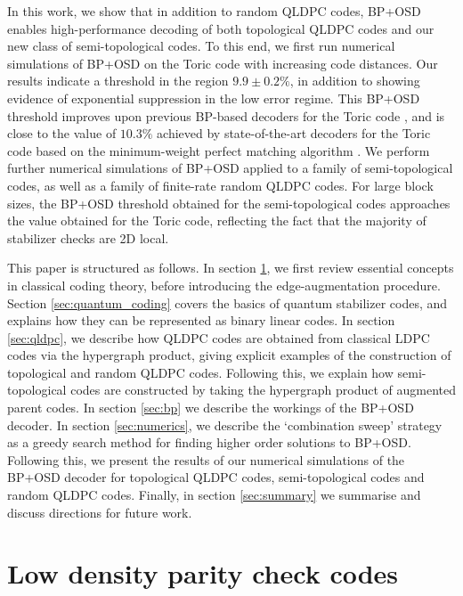 \documentclass[%
 reprint,
superscriptaddress,
nofootinbib,
 amsmath,amssymb,
secnumarabic
]{revtex4-1}
\begin{document}
In this work, we show that in addition to random QLDPC codes, BP+OSD enables high-performance decoding of both topological QLDPC codes and our new class of semi-topological codes. To this end, we first run numerical simulations of BP+OSD on the Toric code with increasing code distances. Our results indicate a threshold in the region $9.9\pm0.2\%$, in addition to showing evidence of exponential suppression in the low error regime. This BP+OSD threshold improves upon previous BP-based decoders for the Toric code \cite{liu2019neural}, and is close to the value of $10.3\%$ achieved by state-of-the-art decoders for the Toric code based on the minimum-weight perfect matching algorithm \cite{Edmonds65,Kolmogorov09,Criger18}. We perform further numerical simulations of BP+OSD applied to a family of semi-topological codes, as well as a family of finite-rate random QLDPC codes. For large block sizes, the BP+OSD threshold obtained for the semi-topological codes approaches the value obtained for the Toric code, reflecting the fact that the majority of stabilizer checks are 2D local.


This paper is structured as follows. In section \ref{sec:ldpc}, we first review essential concepts in classical coding theory, before introducing the edge-augmentation procedure. Section \ref{sec:quantum_coding} covers the basics of quantum stabilizer codes, and explains how they can be represented as binary linear codes. In section \ref{sec:qldpc}, we describe how QLDPC codes are obtained from classical LDPC codes via the hypergraph product, giving explicit examples of the construction of topological and random QLDPC codes. Following this, we explain how semi-topological codes are constructed by taking the hypergraph product of augmented parent codes. In section \ref{sec:bp} we describe the workings of the BP+OSD decoder. In section \ref{sec:numerics}, we describe the `combination sweep' strategy as a greedy search method for finding higher order solutions to BP+OSD. Following this, we present the results of our numerical simulations of the BP+OSD decoder for topological QLDPC codes, semi-topological codes and random QLDPC codes. Finally, in section \ref{sec:summary} we summarise and discuss directions for future work. 


\section{Low density parity check codes} \label{sec:ldpc}
\end{document}
